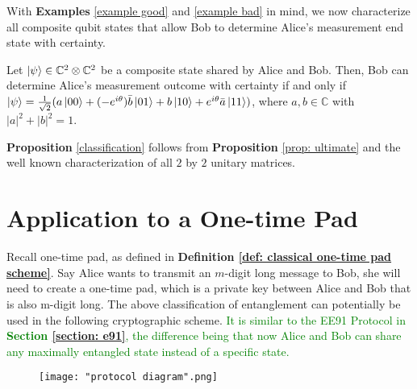


With {\bf{Examples}} \ref{example good} and \ref{example bad} in mind, we now characterize all composite qubit states that allow Bob to determine Alice's measurement end state with certainty.  
\begin{prop}
\label{classification}
Let $\ket{\psi} \in {\mathbb{C}}^2 \otimes {\mathbb{C}}^2$ be a composite state shared by Alice and Bob.  Then, Bob can determine Alice's measurement outcome with certainty if and only if $\ket{\psi}=\frac{1}{\sqrt{2}}(a\ket{00}+(-e^{i\theta})\Bar{b}\ket{01}+b\ket{10}+e^{i\theta}\Bar{a}\ket{11})$, where $a, b \in \mathbb{C}$ with $|a|^2+|b|^2=1$.
\end{prop}
{\bf{Proposition}} \ref{classification} follows from {\bf{Proposition}} \ref{prop: ultimate} and the well known characterization of all $2$ by $2$ unitary matrices.


\pagebreak

\section{Application to a One-time Pad}
Recall one-time pad, as defined in \textbf{Definition \ref{def: classical one-time pad scheme}}. Say Alice wants to transmit an $m$-digit long message to Bob, she will need to create a one-time pad, which is a private key between Alice and Bob that is also m-digit long. The above classification of entanglement can potentially be used in the following cryptographic scheme. \textcolor{green}{It is similar to the EE91 Protocol in \textbf{Section \ref{section: e91}}, the difference being that now Alice and Bob can share any maximally entangled state instead of a specific state.}

\begin{figure}[h]
    \centering
    \texttt{[image: "protocol diagram".png]}
    \label{fig:protocol diagram}
\end{figure}

